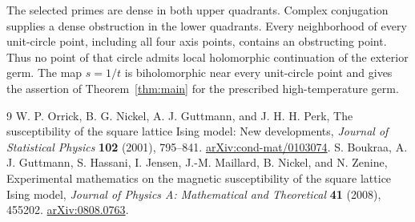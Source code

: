 \documentclass[11pt]{article}
\numberwithin{equation}{section}
\theoremstyle{remark}\newtheorem{remark}[theorem]{Remark}
\begin{document}
The selected primes are dense in both upper quadrants.
Complex conjugation supplies a dense obstruction in the lower
quadrants. Every neighborhood of every unit-circle point,
including all four axis points, contains an obstructing point.
Thus no point of that circle admits local holomorphic continuation
of the exterior germ. The map $s=1/t$ is biholomorphic near every
unit-circle point and gives the assertion of
Theorem~\ref{thm:main} for the prescribed high-temperature germ.


\begin{thebibliography}{9}
W. P. Orrick, B. G. Nickel, A. J. Guttmann, and J. H. H. Perk,
The susceptibility of the square lattice Ising model: New developments,
\emph{Journal of Statistical Physics} \textbf{102} (2001), 795--841.
\href{https://arxiv.org/abs/cond-mat/0103074}{arXiv:cond-mat/0103074}.
S. Boukraa, A. J. Guttmann, S. Hassani, I. Jensen, J.-M. Maillard,
B. Nickel, and N. Zenine, Experimental mathematics on the magnetic
susceptibility of the square lattice Ising model,
\emph{Journal of Physics A: Mathematical and Theoretical}
\textbf{41} (2008), 455202.
\href{https://arxiv.org/abs/0808.0763}{arXiv:0808.0763}.
\end{thebibliography}
\end{document}
